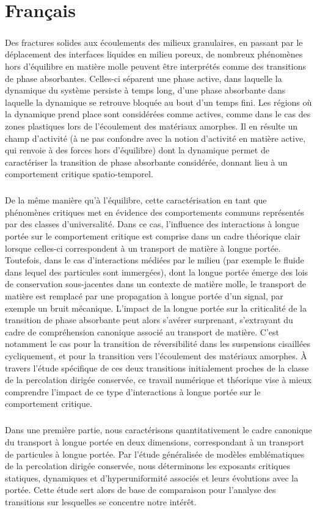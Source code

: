 \documentclass[10pt,a4paper]{article}
\begin{document}
\section{Français}

\subparagraph{}Des fractures solides aux écoulements des milieux granulaires, en passant par le déplacement des interfaces liquides en milieu poreux, de nombreux phénomènes hors d’équilibre en matière molle peuvent être interprétés comme des transitions de phase absorbantes. Celles-ci séparent une phase active, dans laquelle la dynamique du système persiste à temps long, d'une phase absorbante dans laquelle la dynamique se retrouve bloquée au bout d’un temps fini. Les régions où la dynamique prend place sont considérées comme actives, comme dans le cas des zones plastiques lors de l'écoulement des matériaux amorphes. Il en résulte un champ d’activité (à ne pas confondre avec la notion d’activité en matière active, qui renvoie à des forces hors d’équilibre) dont la dynamique permet de caractériser la transition de phase absorbante considérée, donnant lieu à un comportement critique spatio-temporel.

\subparagraph{}De la même manière qu'à l'équilibre, cette caractérisation en tant que phénomènes critiques met en évidence des comportements communs représentés par des classes d'universalité. Dans ce cas, l'influence des interactions à longue portée sur le comportement critique est comprise dans un cadre théorique clair lorsque celles-ci correspondent à un transport de matière à longue portée. Toutefois, dans le cas d'interactions médiées par le milieu (par exemple le fluide dans lequel des particules sont immergées), dont la longue portée émerge des lois de conservation sous-jacentes dans un contexte de matière molle, le transport de matière est remplacé par une propagation à longue portée d’un signal, par exemple un bruit mécanique. L'impact de la longue portée sur la criticalité de la transition de phase absorbante peut alors s'avérer surprenant, s'extrayant du cadre de compréhension canonique associé au transport de matière. C'est notamment le cas pour la transition de réversibilité dans les suspensions cisaillées cycliquement, et pour la transition vers l'écoulement des matériaux amorphes. \`A travers l'étude spécifique de ces deux transitions initialement proches de la classe de la percolation dirigée conservée, ce travail numérique et théorique vise à mieux comprendre l'impact de ce type d'interactions à longue portée sur le comportement critique.

\subparagraph{}Dans une première partie, nous caractérisons quantitativement le cadre canonique du transport à longue portée en deux dimensions, correspondant à un transport de particules à longue portée. Par l'étude généralisée de modèles emblématiques de la percolation dirigée conservée, nous déterminons les exposants critiques statiques, dynamiques et d'hyperuniformité associés et leurs évolutions avec la portée. Cette étude sert alors de base de comparaison pour l'analyse des transitions sur lesquelles se concentre notre intérêt.
\end{document}
